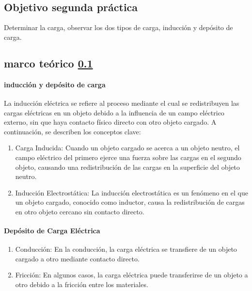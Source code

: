 \documentclass{article}
\begin{document}
\begin{multicols}{2}
\subsection{Objetivo segunda práctica}\label{Objetivo segunda práctica}	
	Determinar la carga, observar los dos tipos de carga, inducción y depósito de carga.
	\subsection{marco teórico \ref{Objetivo segunda práctica}}
	\paragraph*{inducción y depósito de carga}
	La inducción eléctrica se refiere al proceso mediante el cual se redistribuyen
	las cargas eléctricas en un objeto debido a la influencia de un campo eléctrico externo,
	sin que haya contacto físico directo con otro objeto cargado. A continuación, se describen
	los conceptos clave:

	\begin{enumerate}
		\item Carga Inducida: Cuando un objeto cargado se acerca a un objeto neutro, el campo eléctrico del primero ejerce una fuerza sobre las cargas en el segundo objeto, causando una redistribución de las cargas en la superficie del objeto neutro.

\item Inducción Electrostática: La inducción electrostática es un fenómeno en el que un objeto cargado, conocido como inductor, causa la redistribución de cargas en otro objeto cercano sin contacto directo.

\end{enumerate}

\paragraph*{Depósito de Carga Eléctrica}

\begin{enumerate}

\item Conducción: En la conducción, la carga eléctrica se transfiere de un objeto cargado a otro mediante contacto directo.

\item Fricción: En algunos casos, la carga eléctrica puede transferirse de un objeto a otro debido a la fricción entre los materiales.


\end{enumerate}
\end{multicols}
\end{document}
